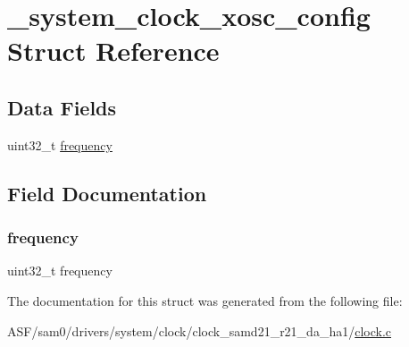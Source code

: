 \hypertarget{struct__system__clock__xosc__config}{}\section{\+\_\+system\+\_\+clock\+\_\+xosc\+\_\+config Struct Reference}
\label{struct__system__clock__xosc__config}
\subsection*{Data Fields}
\begin{DoxyCompactItemize}
\item 
uint32\+\_\+t \mbox{\hyperlink{struct__system__clock__xosc__config_ab632fb0b4d5156ea4df0b1e15410e913}{frequency}}
\end{DoxyCompactItemize}


\subsection{Field Documentation}
\mbox{\label{struct__system__clock__xosc__config_ab632fb0b4d5156ea4df0b1e15410e913}} 
\subsubsection{\texorpdfstring{frequency}{frequency}}
{\footnotesize\ttfamily uint32\+\_\+t frequency}



The documentation for this struct was generated from the following file\+:\begin{DoxyCompactItemize}
\item 
A\+S\+F/sam0/drivers/system/clock/clock\+\_\+samd21\+\_\+r21\+\_\+da\+\_\+ha1/\mbox{\hyperlink{clock_8c}{clock.\+c}}\end{DoxyCompactItemize}
